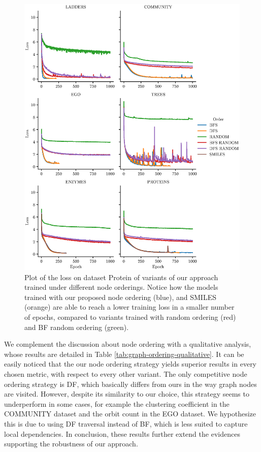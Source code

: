 \begin{figure}[h!]
\centering
\includegraphics[width=\textwidth]{Figures/Chapter6/loss.eps}
\caption{Plot of the loss on dataset Protein of variants of our approach trained under different node orderings. Notice how the models trained with our proposed node ordering (blue), and SMILES (orange) are able to reach a lower training loss in a smaller number of epochs, compared to variants trained with random ordering (red) and BF random ordering (green).}
\label{fig:loss}
\end{figure}
We complement the discussion about node ordering with a qualitative analysis, whose results are detailed in Table \ref{tab:graph-ordering-qualitative}. It can be easily noticed that the our node ordering strategy yields superior results in every chosen metric, with respect to every other variant. The only competitive node ordering strategy is DF, which basically differs from ours in the way graph nodes are visited. However, despite its similarity to our choice, this strategy seems to underperform in some cases, for example the clustering coefficient in the COMMUNITY dataset and the orbit count in the EGO dataset. We hypothesize this is due to using DF traversal instead of BF, which is less suited to capture local dependencies. In conclusion, these results further extend the evidences supporting the robustness of our approach.
\begin{landscape}

\end{landscape}